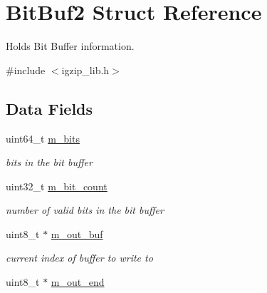 \hypertarget{structBitBuf2}{\section{Bit\-Buf2 Struct Reference}
\label{structBitBuf2}
}


Holds Bit Buffer information.  




{\ttfamily \#include $<$igzip\-\_\-lib.\-h$>$}

\subsection*{Data Fields}
\begin{DoxyCompactItemize}
\item 
\hypertarget{structBitBuf2_aacc18f894ebd91816c384b9057770fac}{uint64\-\_\-t \hyperlink{structBitBuf2_aacc18f894ebd91816c384b9057770fac}{m\-\_\-bits}}\label{structBitBuf2_aacc18f894ebd91816c384b9057770fac}

\begin{DoxyCompactList}\small\item\em bits in the bit buffer \end{DoxyCompactList}\item 
\hypertarget{structBitBuf2_a446dd553f29ac2941bb570f89f188230}{uint32\-\_\-t \hyperlink{structBitBuf2_a446dd553f29ac2941bb570f89f188230}{m\-\_\-bit\-\_\-count}}\label{structBitBuf2_a446dd553f29ac2941bb570f89f188230}

\begin{DoxyCompactList}\small\item\em number of valid bits in the bit buffer \end{DoxyCompactList}\item 
\hypertarget{structBitBuf2_a7ec2667d96d3d242150c703fde685c11}{uint8\-\_\-t $\ast$ \hyperlink{structBitBuf2_a7ec2667d96d3d242150c703fde685c11}{m\-\_\-out\-\_\-buf}}\label{structBitBuf2_a7ec2667d96d3d242150c703fde685c11}

\begin{DoxyCompactList}\small\item\em current index of buffer to write to \end{DoxyCompactList}\item 
\hypertarget{structBitBuf2_ac122f67aef743267a779af8030d9bf08}{uint8\-\_\-t $\ast$ \hyperlink{structBitBuf2_ac122f67aef743267a779af8030d9bf08}{m\-\_\-out\-\_\-end}}\label{structBitBuf2_ac122f67aef743267a779af8030d9bf08}


\end{DoxyCompactItemize}
